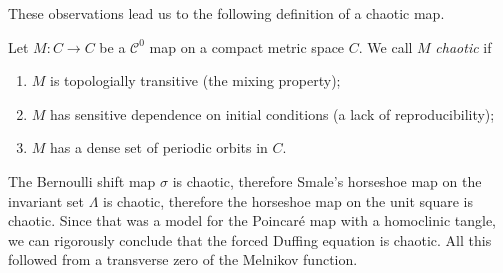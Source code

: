 These observations lead us to the following definition of a chaotic map.

\begin{definition}
	Let $M:C\to C$ be a $\mathcal{C}^{0}$ map on a compact metric space $C$. We call $M$ \emph{chaotic} if
	\begin{enumerate}
		\item $M$ is topologially transitive (the mixing property);
		\item $M$ has sensitive dependence on initial conditions (a lack of reproducibility);
		\item $M$ has a dense set of periodic orbits in $C$.
	\end{enumerate}
\end{definition}
The Bernoulli shift map $\sigma$ is chaotic, therefore Smale's horseshoe map on the invariant set $\Lambda$ is chaotic, therefore the horseshoe map on the unit square is chaotic. Since that was a model for the Poincaré map with a homoclinic tangle, we can rigorously conclude that the forced Duffing equation is chaotic. All this followed from a transverse zero of the Melnikov function.

